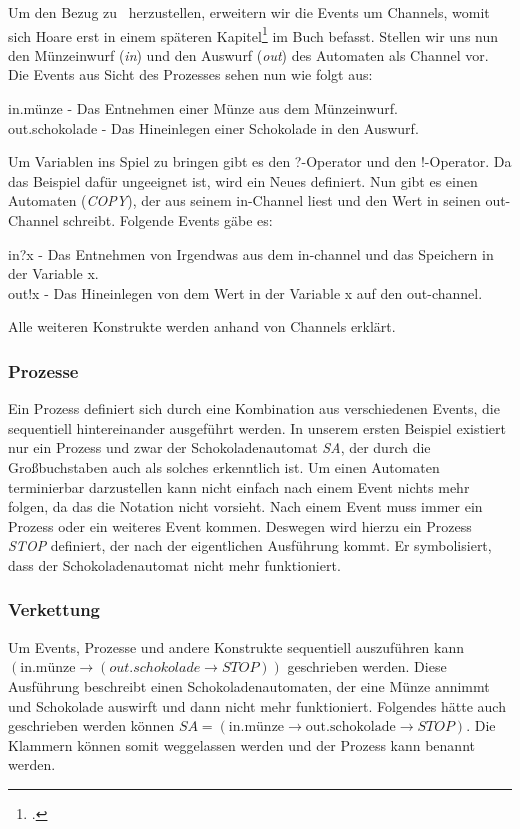 Um den Bezug zu \CA\ herzustellen, erweitern wir die Events um Channels, womit sich Hoare erst in einem späteren Kapitel\footcite[4.2]{CSPBOOK} im Buch befasst. Stellen wir uns nun den Münzeinwurf (\textit{in}) und den Auswurf (\textit{out}) des Automaten als Channel vor. Die Events aus Sicht des Prozesses sehen nun wie folgt aus:

\begin{addmargin}[1cm]{0cm}
in.münze - Das Entnehmen einer Münze aus dem Münzeinwurf.\\
out.schokolade - Das Hineinlegen einer Schokolade in den Auswurf.
\end{addmargin}

Um Variablen ins Spiel zu bringen gibt es den ?-Operator und den !-Operator. Da das Beispiel dafür ungeeignet ist, wird ein Neues definiert. Nun gibt es einen Automaten (\textit{COPY}), der aus seinem in-Channel liest und den Wert in seinen out-Channel schreibt. Folgende Events gäbe es:

\begin{addmargin}[1cm]{0cm}
in?x - Das Entnehmen von Irgendwas aus dem in-channel und das Speichern in der Variable x.\\
out!x - Das Hineinlegen von dem Wert in der Variable x auf den out-channel.
\end{addmargin}

Alle weiteren Konstrukte werden anhand von Channels erklärt.

\subsubsection{Prozesse}
Ein Prozess definiert sich durch eine Kombination aus verschiedenen Events, die sequentiell hintereinander ausgeführt werden. In unserem ersten Beispiel existiert nur ein Prozess und zwar der Schokoladenautomat \textit{SA}, der durch die Großbuchstaben auch als solches erkenntlich ist. Um einen Automaten terminierbar darzustellen kann nicht einfach nach einem Event nichts mehr folgen, da das die Notation nicht vorsieht. Nach einem Event muss immer ein Prozess oder ein weiteres Event kommen. Deswegen wird hierzu ein Prozess \textit{STOP} definiert, der nach der eigentlichen Ausführung kommt. Er symbolisiert, dass der Schokoladenautomat nicht mehr funktioniert.

\subsubsection{Verkettung}
Um Events, Prozesse und andere Konstrukte sequentiell auszuführen kann $ (\text{in.münze} \rightarrow (out.schokolade \rightarrow STOP)) $ geschrieben werden. Diese Ausführung beschreibt einen Schokoladenautomaten, der eine Münze annimmt und Schokolade auswirft und dann nicht mehr funktioniert. Folgendes hätte auch geschrieben werden können $ SA = (\text{in.münze} \rightarrow \text{out.schokolade} \rightarrow STOP) $. Die Klammern können somit weggelassen werden und der Prozess kann benannt werden.

